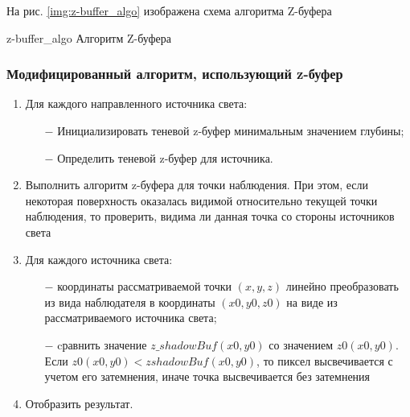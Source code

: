 На рис. \ref{img:z-buffer_algo} изображена схема алгоритма Z-буфера

\img{180mm}
{z-buffer_algo} %
{Алгоритм Z-буфера} %
\clearpage
%
\subsubsection{Модифицированный алгоритм, использующий z-буфер}
\begin{enumerate}
    \item Для каждого направленного источника света:
    \begin{enumerate}
        \item[$-$] Инициализировать теневой z-буфер минимальным значением глубины;
        \item[$-$] Определить теневой z-буфер для источника.
    \end{enumerate}
    \item Выполнить алгоритм z-буфера для точки наблюдения. При этом, если
    некоторая поверхность оказалась видимой относительно текущей точки
    наблюдения, то проверить, видима ли данная точка со стороны источников света
    \item Для каждого источника света:
    \begin{enumerate}
        \item[$-$] координаты рассматриваемой точки \((x, y, z)\) линейно преобразовать из вида наблюдателя в координаты
        \((x0, y0, z0)\) на виде из рассматриваемого источника света;
        \item[$-$] cравнить значение \(z\_shadowBuf (x0, y0)\) со значением \(z0(x0, y0)\).
        Если \(z0(x0, y0) < zshadowBuf (x0, y0)\), то пиксел высвечивается с учетом его
        затемнения, иначе точка высвечивается без затемнения
    \end{enumerate}
    \item Отобразить результат.
\end{enumerate}

